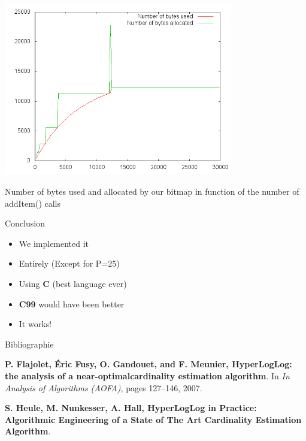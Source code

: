 \documentclass{beamer}
\begin{document}
\begin{frame}
	\begin{center}
		\includegraphics[width=10cm]{plot_memoryUsage.png} \\
	\end{center}
	Number of bytes used and allocated by our bitmap in function of the number of addItem() calls
\end{frame}

\begin{frame}{Conclusion}
  \begin{itemize}
    \item We implemented it
    \pause
    \item Entirely (Except for P=25)
    \pause
    \item Using \textbf{C} (best language ever)
    \pause
    \item \textbf{C99} would have been better 
    \pause
    \item It works!
    \pause 
  \end{itemize}
\end{frame}


\begin{frame}{Bibliographie}  \begin{thebibliography}{}

\textbf{P. Flajolet, Éric Fusy, O. Gandouet, and F. Meunier, HyperLogLog: the analysis of a near-optimalcardinality estimation algorithm}. In \emph{In Analysis of
Algorithms (AOFA)}, pages 127–146, 2007.

\textbf{S. Heule, M. Nunkesser, A. Hall, HyperLogLog in Practice: Algorithmic Engineering of a State of The Art Cardinality Estimation Algorithm}.

\end{thebibliography}

\end{frame}
\end{document}
